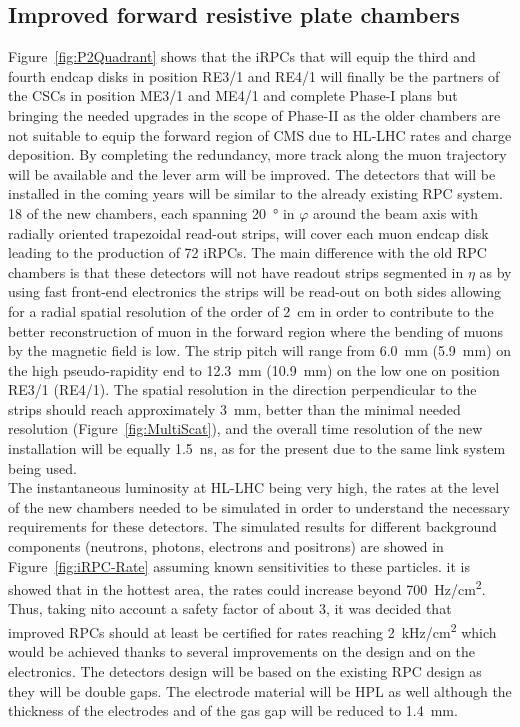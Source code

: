 	\subsection{Improved forward resistive plate chambers}
	\label{chapt3:ssec:iRPCs}
	
	Figure~\ref{fig:P2Quadrant} shows that the iRPCs that will equip the third and fourth endcap disks in position RE3/1 and RE4/1 will finally be the partners of the CSCs in position ME3/1 and ME4/1 and complete Phase-I plans but bringing the needed upgrades in the scope of Phase-II as the older chambers are not suitable to equip the forward region of CMS due to HL-LHC rates and charge deposition. By completing the redundancy, more track along the muon trajectory will be available and the lever arm will be improved. The detectors that will be installed in the coming years will be similar to the already existing RPC system. 18 of the new chambers, each spanning \SI{20}{\degree} in $\varphi$ around the beam axis with radially oriented trapezoidal read-out strips, will cover each muon endcap disk leading to the production of 72 iRPCs. The main difference with the old RPC chambers is that these detectors will not have readout strips segmented in $\eta$ as by using fast front-end electronics the strips will be read-out on both sides allowing for a radial spatial resolution of the order of \SI{2}{cm} in order to contribute to the better reconstruction of muon in the forward region where the bending of muons by the magnetic field is low. The strip pitch will range from \SI{6.0}{mm} (\SI{5.9}{mm}) on the high pseudo-rapidity end to \SI{12.3}{mm} (\SI{10.9}{mm}) on the low one on position RE3/1 (RE4/1). The spatial resolution in the direction perpendicular to the strips should reach approximately \SI{3}{mm}, better than the minimal needed resolution (Figure~\ref{fig:MultiScat}), and the overall time resolution of the new installation will be equally \SI{1.5}{ns}, as for the present due to the same link system being used.\\
	
	The instantaneous luminosity at HL-LHC being very high, the rates at the level of the new chambers needed to be simulated in order to understand the necessary requirements for these detectors. The simulated results for different background components (neutrons, photons, electrons and positrons) are showed in Figure~\ref{fig:iRPC-Rate} assuming known sensitivities to these particles. it is showed that in the hottest area, the rates could increase beyond \SI{700}{Hz/cm^2}. Thus, taking nito account a safety factor of about 3, it was decided that improved RPCs should at least be certified for rates reaching \SI{2}{kHz/cm^2} which would be achieved thanks to several improvements on the design and on the electronics. The detectors design will be based on the existing RPC design as they will be double gaps. The electrode material will be HPL as well although the thickness of the electrodes and of the gas gap will be reduced to \SI{1.4}{mm}.

